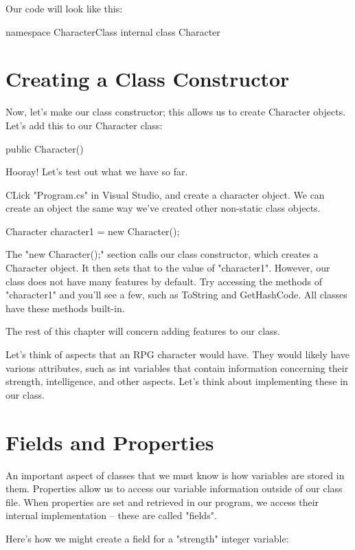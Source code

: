 \documentclass[oneside, openany] {book}
\begin{document}
Our code will look like this:
\begin{CSharp}
namespace CharacterClass
{
    internal class Character
    {
    }
}
\end{CSharp}

\section{Creating a Class Constructor}
Now, let's make our class constructor; this allows us to create Character objects. Let's add this to our Character class:

\begin{CSharp}
public Character()
{}
\end{CSharp}
Hooray! Let's test out what we have so far. 

CLick "Program.cs" in Visual Studio, and create a character object. We can create an object the same way we've created other non-static class objects.

\begin{CSharp}
Character character1 = new Character();
\end{CSharp}

The "new Character();" section calls our class constructor, which creates a Character object. It then sets that to the value of "character1".
However, our class does not have many features by default. Try accessing the methods of "character1" and you'll see a few, such as ToString and GetHashCode. All classes have these methods built-in.

The rest of this chapter will concern adding features to our class.

Let's think of aspects that an RPG character would have. They would likely have various attributes, such as int variables that contain information concerning their strength, intelligence, and other aspects. Let's think about implementing these in our class.

\section{Fields and Properties}
An important aspect of classes that we must know is how variables are stored in them. Properties allow us to access our variable information outside of our class file. When properties are set and retrieved in our program, we access their internal implementation -- these are called "fields".

Here's how we might create a field for a "strength" integer variable:
\end{document}
